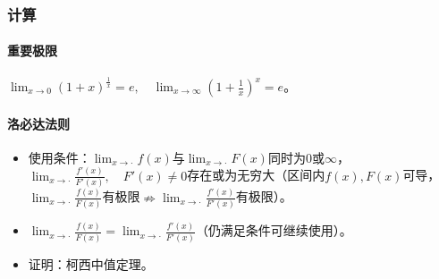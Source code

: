 \documentclass[
12pt, %
a4paper, 
oneside, %
]{scrartcl}
\begin{document}
\subsubsection[计算]{计算}
\paragraph{重要极限}
$ \lim_{x \to 0} (1 + x)^{\frac{1}{x}} = e, \quad \lim_{x \to \infty} (1 + \frac{1}{x})^{x} = e $。
\paragraph{洛必达法则}
\begin{itemize}
\item 使用条件：$ \lim_{x \to \cdot} f(x) $与$ \lim_{x \to \cdot} F(x) $同时为$ 0 $或$ \infty $，$ \lim_{x \to \cdot} \frac{f'(x)}{F'(x)}, \quad F'(x) \neq 0 $存在或为无穷大（区间内$ f(x), F(x) $可导，$ \lim_{x \to \cdot} \frac{f(x)}{F(x)} $有极限$ \not\Rightarrow $$ \lim_{x \to \cdot} \frac{f'(x)}{F'(x)} $有极限）。
\item $ \lim_{x \to \cdot} \frac{f(x)}{F(x)} = \lim_{x \to \cdot} \frac{f'(x)}{F'(x)} $（仍满足条件可继续使用）。
\item 证明：柯西中值定理。
\end{itemize}
\end{document}
